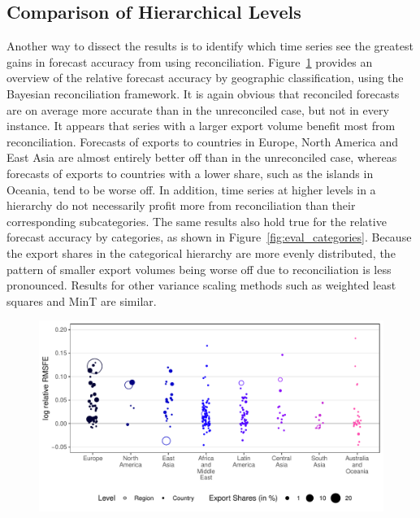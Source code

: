 \documentclass[a4paper,fleqn,11pt]{article}
\begin{document}
\subsection{Comparison of Hierarchical Levels}
Another way to dissect the results is to identify which time series see the greatest gains in forecast accuracy from using reconciliation. Figure~\ref{fig:eval_regions} provides an overview of the relative forecast accuracy by geographic classification, using the Bayesian reconciliation framework. It is again obvious that reconciled forecasts are on average more accurate than in the unreconciled case, but not in every instance. It appears that series with a larger export volume benefit most from reconciliation. Forecasts of exports to countries in Europe, North America and East Asia are almost entirely better off than in the unreconciled case, whereas forecasts of exports to countries with a lower share, such as the islands in Oceania, tend to be worse off. In addition, time series at higher levels in a hierarchy do not necessarily profit more from reconciliation than their corresponding subcategories. The same results also hold true for the relative forecast accuracy by categories, as shown in Figure~\ref{fig:eval_categories}. Because the export shares in the categorical hierarchy are more evenly distributed, the pattern of smaller export volumes being worse off due to reconciliation is less pronounced. Results for other variance scaling methods such as weighted least squares and MinT are similar.

\begin{figure}[H]
	\includegraphics[width=\textwidth]{fig/fig_eval_regions}
	\label{fig:eval_regions}
\end{figure}
\end{document}
